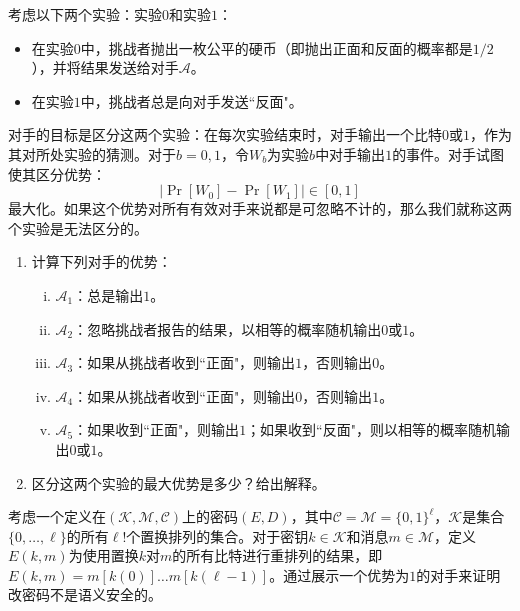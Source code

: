 \begin{exercise}[在简单环境下计算优势]
考虑以下两个实验：实验$0$和实验$1$：
\begin{itemize}
	\item 在实验$0$中，挑战者抛出一枚公平的硬币（即抛出正面和反面的概率都是$1/2$），并将结果发送给对手$\mathcal{A}$。
	\item 在实验$1$中，挑战者总是向对手发送``反面"。
\end{itemize}
对手的目标是区分这两个实验：在每次实验结束时，对手输出一个比特$0$或$1$，作为其对所处实验的猜测。对于$b=0,1$，令$W_b$为实验$b$中对手输出$1$的事件。对手试图使其区分优势：
\[
\big\vert\Pr[W_0]-\Pr[W_1]\big\vert\in[0,1]
\]
最大化。如果这个优势对所有有效对手来说都是可忽略不计的，那么我们就称这两个实验是无法区分的。
\begin{enumerate}[\indent(a)]
	\item 计算下列对手的优势：
	\begin{enumerate}[(i)]
		\item $\mathcal{A}_1$：总是输出$1$。
		\item $\mathcal{A}_2$：忽略挑战者报告的结果，以相等的概率随机输出$0$或$1$。
		\item $\mathcal{A}_3$：如果从挑战者收到``正面"，则输出$1$，否则输出$0$。
		\item $\mathcal{A}_4$：如果从挑战者收到``正面"，则输出$0$，否则输出$1$。
		\item $\mathcal{A}_5$：如果收到``正面"，则输出$1$；如果收到``反面"，则以相等的概率随机输出$0$或$1$。
	\end{enumerate}
	\item 区分这两个实验的最大优势是多少？给出解释。
\end{enumerate}
\end{exercise}

\begin{exercise}[置换密码]
考虑一个定义在$(\mathcal{K},\mathcal{M},\mathcal{C})$上的密码$(E,D)$，其中$\mathcal{C}=\mathcal{M}=\{0,1\}^\ell$，$\mathcal{K}$是集合$\{0,\dots,\ell\}$的所有$\ell!$个置换排列的集合。对于密钥$k\in\mathcal{K}$和消息$m\in\mathcal{M}$，定义$E(k,m)$为使用置换$k$对$m$的所有比特进行重排列的结果，即$E(k,m)=m[k(0)]\dots m[k(\ell-1)]$。通过展示一个优势为$1$的对手来证明改密码不是语义安全的。
\end{exercise}

